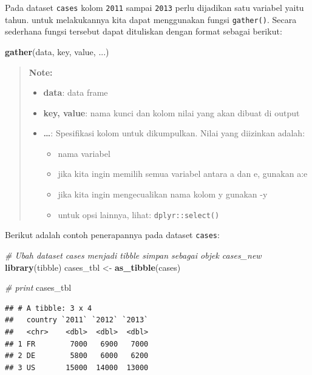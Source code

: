 \documentclass[]{book}
\newenvironment{Shaded}{\begin{snugshade}}{\end{snugshade}}
\newcommand{\KeywordTok}[1]{\textcolor[rgb]{0.13,0.29,0.53}{\textbf{#1}}}
\newcommand{\StringTok}[1]{\textcolor[rgb]{0.31,0.60,0.02}{#1}}
\newcommand{\CommentTok}[1]{\textcolor[rgb]{0.56,0.35,0.01}{\textit{#1}}}
\newcommand{\NormalTok}[1]{#1}
\providecommand{\tightlist}{%
  \setlength{\itemsep}{0pt}\setlength{\parskip}{0pt}}
\begin{document}
Pada dataset \texttt{cases} kolom \texttt{2011} sampai \texttt{2013}
perlu dijadikan satu variabel yaitu tahun. untuk melakukannya kita dapat
menggunakan fungsi \texttt{gather()}. Secara sederhana fungsi tersebut
dapat dituliskan dengan format sebagai berikut:

\begin{Shaded}
\begin{Highlighting}[]
\KeywordTok{gather}\NormalTok{(data, key, value, ...)}
\end{Highlighting}
\end{Shaded}

\begin{quote}
\textbf{Note: }

\begin{itemize}
\tightlist
\item
  \textbf{data}: data frame
\item
  \textbf{key, value}: nama kunci dan kolom nilai yang akan dibuat di
  output
\item
  \textbf{\ldots{}}: Spesifikasi kolom untuk dikumpulkan. Nilai yang
  diizinkan adalah:

  \begin{itemize}
  \tightlist
  \item
    nama variabel
  \item
    jika kita ingin memilih semua variabel antara a dan e, gunakan a:e
  \item
    jika kita ingin mengecualikan nama kolom y gunakan -y
  \item
    untuk opsi lainnya, lihat: \texttt{dplyr::select()}
  \end{itemize}
\end{itemize}
\end{quote}

Berikut adalah contoh penerapannya pada dataset \texttt{cases}:

\begin{Shaded}
\begin{Highlighting}[]
\CommentTok{# Ubah dataset cases menjadi tibble simpan sebagai objek cases_new}
\KeywordTok{library}\NormalTok{(tibble)}
\NormalTok{cases_tbl <-}\StringTok{ }\KeywordTok{as_tibble}\NormalTok{(cases)}

\CommentTok{# print}
\NormalTok{cases_tbl}
\end{Highlighting}
\end{Shaded}

\begin{verbatim}
## # A tibble: 3 x 4
##   country `2011` `2012` `2013`
##   <chr>    <dbl>  <dbl>  <dbl>
## 1 FR        7000   6900   7000
## 2 DE        5800   6000   6200
## 3 US       15000  14000  13000
\end{verbatim}
\end{document}
